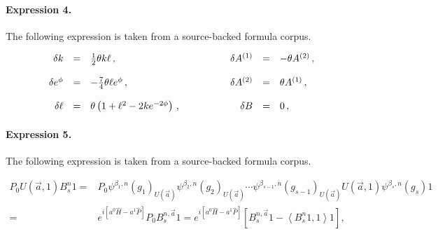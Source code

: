 \documentclass[11pt]{article}
\begin{document}
\paragraph{Expression 4.} The following expression is taken from a source-backed formula corpus.

\begin{align*}\begin{array}{rclrcl}\delta k & = & \frac{1}{2} \theta k\ell\, ,\hspace{1cm}&\delta A^{(1)}&=&-\theta A^{(2)}\, ,\\& & & & & \\\delta e^{\phi}&=&-\frac{7}{4}\theta \ell e^{\phi}\, ,&\delta A^{(2)} & = & \theta A^{(1)}\, ,\\& & & & & \\\delta \ell&=&\theta \left( 1 +\ell^{2} -2k e^{-2\phi}\right)\, ,\hspace{1.5cm}&\delta B&=&0\, ,\\\end{array}\end{align*}

\paragraph{Expression 5.} The following expression is taken from a source-backed formula corpus.

\begin{align*}P_0U(\vec{a},1)B_s^n 1=& P_0\psi^{\beta_1,n}(g_1)_{U(\vec{a})} \psi^{\beta_2,n}(g_2)_{U(\vec{a})} \cdots \psi^{\beta_{s-1},n}(g_{s-1})_{U(\vec{a})}U(\vec{a},1)\psi^{\beta_s,n}(g_s)1 \\=& e^{i[a^0 \hat{H} - a^1\hat{P}]}P_0B_s^{n,\vec{a}}1= e^{i[a^0 \hat{H} - a^1\hat{P}]}\left[B_s^{n,\vec{a}}1 - \left\langle B_s^n 1, 1 \right\rangle 1 \right], \end{align*}
\end{document}
